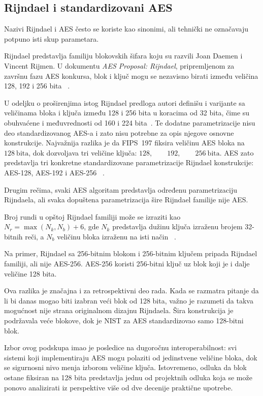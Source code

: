 \subsection{Rijndael i standardizovani AES}
\label{subsec:rijndael_vs_aes}

Nazivi Rijndael i AES često se koriste kao sinonimi, ali tehnički
ne označavaju potpuno isti skup parametara.

Rijndael predstavlja familiju blokovskih šifara koju su razvili
Joan Daemen i Vincent Rijmen. U dokumentu \emph{AES Proposal:
Rijndael}, pripremljenom za završnu fazu AES konkursa, blok i ključ
mogu se nezavisno birati između veličina 128, 192 i 256 bita
~\cite{rijndael-proposal-1999}.

U odeljku o proširenjima istog Rijndael predloga autori definišu i
varijante sa veličinama bloka i ključa između 128 i 256 bita u
koracima od 32 bita, čime su obuhvaćene i međuvrednosti od 160 i
224 bita~\cite{rijndael-proposal-1999}. Te dodatne parametrizacije
nisu deo standardizovanog AES-a i zato nisu potrebne za opis njegove
osnovne konstrukcije.
Najvažnija razlika je da FIPS~197 fiksira veličinu AES bloka na
$128~\text{bita}$,
dok dozvoljava tri veličine ključa:
$128,\qquad192,\qquad256~\text{bita}$.
AES zato predstavlja tri konkretne standardizovane parametrizacije
Rijndael konstrukcije: AES-128, AES-192 i AES-256
~\cite{fips197-2023}.

Drugim rečima, svaki AES algoritam predstavlja određenu
parametrizaciju Rijndaela, ali svaka dopuštena parametrizacija šire
Rijndael familije nije AES.

Broj rundi u opštoj Rijndael familiji može se izraziti kao
$N_r = \max(N_k,N_b) + 6$,
gde $N_k$ predstavlja dužinu ključa izraženu brojem 32-bitnih reči,
a $N_b$ veličinu bloka izraženu na isti način
~\cite{rijndael-proposal-1999}.

Na primer, Rijndael sa 256-bitnim blokom i 256-bitnim ključem pripada
Rijndael familiji, ali nije AES-256. AES-256 koristi 256-bitni ključ
uz blok koji je i dalje veličine 128 bita.

Ova razlika je značajna i za retrospektivni deo rada. Kada se razmatra
pitanje da li bi danas mogao biti izabran veći blok od 128 bita, važno
je razumeti da takva mogućnost nije strana originalnom dizajnu
Rijndaela. Šira konstrukcija je podržavala veće blokove, dok je NIST
za AES standardizovao samo 128-bitni blok.

Izbor ovog podskupa imao je posledice na dugoročnu interoperabilnost:
svi sistemi koji implementiraju AES mogu polaziti od jedinstvene
veličine bloka, dok se sigurnosni nivo menja izborom veličine ključa.
Istovremeno, odluka da blok ostane fiksiran na 128 bita predstavlja
jednu od projektnih odluka koja se može ponovo analizirati iz
perspektive više od dve decenije praktične upotrebe.
